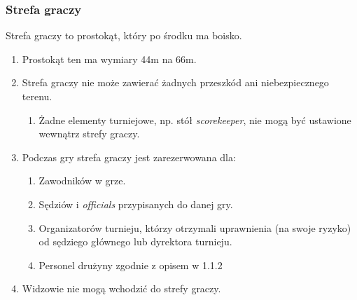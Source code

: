 \documentclass[11pt,a4paper]{article}
\begin{document}

\subsubsection{Strefa graczy}
Strefa graczy to prostokąt, który po środku ma boisko.
\begin{enumerate}
  \item Prostokąt ten ma wymiary 44m na 66m.
  \item Strefa graczy nie może zawierać żadnych przeszkód ani niebezpiecznego terenu.
  \begin{enumerate}
    \item Żadne elementy turniejowe, np. stół \emph{scorekeeper}, nie mogą być ustawione wewnątrz strefy graczy.
  \end{enumerate}
  \item Podczas gry strefa graczy jest zarezerwowana dla:
  \begin{enumerate}
    \item Zawodników w grze.
    \item Sędziów i \emph{officials} przypisanych do danej gry.
    \item Organizatorów turnieju, którzy otrzymali uprawnienia (na swoje ryzyko) od sędziego głównego lub dyrektora turnieju.
    \item Personel drużyny zgodnie z opisem w 1.1.2 %
  \end{enumerate}
  \item Widzowie nie mogą wchodzić do strefy graczy.
\end{enumerate}

\end{document}
